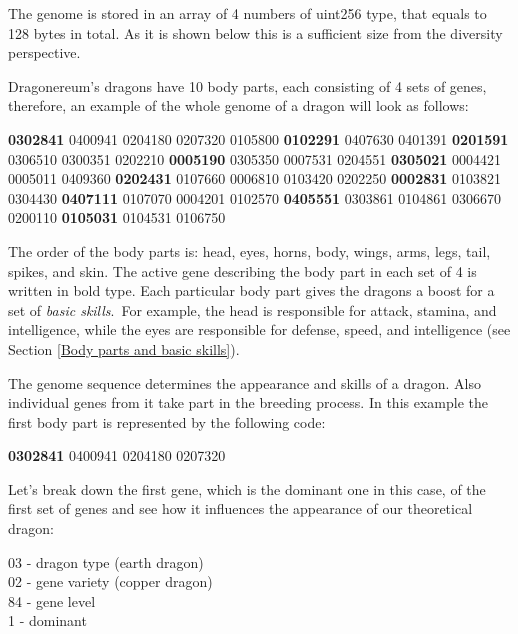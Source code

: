 \documentclass[12pt]{article}
\begin{document}
The genome is stored in an array of 4 numbers of uint256 type, that equals to 128 bytes in total. As it is shown below this is a sufficient size from the diversity perspective.\par

Dragonereum’s dragons have 10 body parts, each consisting of 4 sets of genes, therefore, an example of the whole genome of a dragon will look as follows:\par

\textbf{0302841} 0400941 0204180 0207320 0105800 \textbf{0102291} 0407630 0401391 \textbf{0201591} 0306510 0300351 0202210 \textbf{0005190} 0305350 0007531 0204551 \textbf{0305021} 0004421 0005011 0409360 \textbf{0202431} 0107660 0006810 0103420 0202250 \textbf{0002831} 0103821 0304430 \textbf{0407111} 0107070 0004201 0102570 \textbf{0405551} 0303861 0104861 0306670 0200110 \textbf{0105031} 0104531 0106750\par

The order of the body parts is: head, eyes, horns, body, wings, arms, legs, tail, spikes, and skin. The active gene describing the body part in each set of 4 is written in bold type. Each particular body part gives the dragons a boost for a set of\textit{ basic skills}.\ For example, the head is responsible for attack, stamina, and intelligence, while the eyes are responsible for defense, speed, and intelligence (see Section \ref{Body parts and basic skills}).\par

The genome sequence determines the appearance and skills of a dragon. Also individual genes from it take part in the breeding process. In this example the first body part is represented by the following code:\par

\textbf{0302841} 0400941 0204180 0207320\par


\vspace{\baselineskip}

\begin{samepage}
Let's break down the first gene, which is the dominant one in this case, of the first set of genes and see how it influences the appearance of our theoretical dragon: 

03 - dragon type (earth dragon) \\
02 - gene variety (copper dragon) \\
84 - gene level \\
1 - dominant 
\end{samepage}
\end{document}
